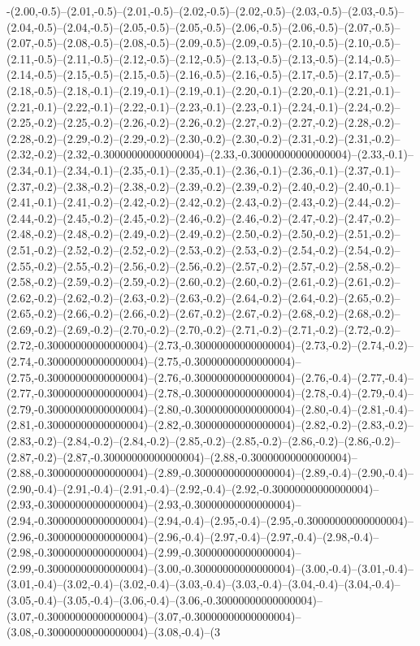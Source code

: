 -(2.00,-0.5)--(2.01,-0.5)--(2.01,-0.5)--(2.02,-0.5)--(2.02,-0.5)--(2.03,-0.5)--(2.03,-0.5)--(2.04,-0.5)--(2.04,-0.5)--(2.05,-0.5)--(2.05,-0.5)--(2.06,-0.5)--(2.06,-0.5)--(2.07,-0.5)--(2.07,-0.5)--(2.08,-0.5)--(2.08,-0.5)--(2.09,-0.5)--(2.09,-0.5)--(2.10,-0.5)--(2.10,-0.5)--(2.11,-0.5)--(2.11,-0.5)--(2.12,-0.5)--(2.12,-0.5)--(2.13,-0.5)--(2.13,-0.5)--(2.14,-0.5)--(2.14,-0.5)--(2.15,-0.5)--(2.15,-0.5)--(2.16,-0.5)--(2.16,-0.5)--(2.17,-0.5)--(2.17,-0.5)--(2.18,-0.5)--(2.18,-0.1)--(2.19,-0.1)--(2.19,-0.1)--(2.20,-0.1)--(2.20,-0.1)--(2.21,-0.1)--(2.21,-0.1)--(2.22,-0.1)--(2.22,-0.1)--(2.23,-0.1)--(2.23,-0.1)--(2.24,-0.1)--(2.24,-0.2)--(2.25,-0.2)--(2.25,-0.2)--(2.26,-0.2)--(2.26,-0.2)--(2.27,-0.2)--(2.27,-0.2)--(2.28,-0.2)--(2.28,-0.2)--(2.29,-0.2)--(2.29,-0.2)--(2.30,-0.2)--(2.30,-0.2)--(2.31,-0.2)--(2.31,-0.2)--(2.32,-0.2)--(2.32,-0.30000000000000004)--(2.33,-0.30000000000000004)--(2.33,-0.1)--(2.34,-0.1)--(2.34,-0.1)--(2.35,-0.1)--(2.35,-0.1)--(2.36,-0.1)--(2.36,-0.1)--(2.37,-0.1)--(2.37,-0.2)--(2.38,-0.2)--(2.38,-0.2)--(2.39,-0.2)--(2.39,-0.2)--(2.40,-0.2)--(2.40,-0.1)--(2.41,-0.1)--(2.41,-0.2)--(2.42,-0.2)--(2.42,-0.2)--(2.43,-0.2)--(2.43,-0.2)--(2.44,-0.2)--(2.44,-0.2)--(2.45,-0.2)--(2.45,-0.2)--(2.46,-0.2)--(2.46,-0.2)--(2.47,-0.2)--(2.47,-0.2)--(2.48,-0.2)--(2.48,-0.2)--(2.49,-0.2)--(2.49,-0.2)--(2.50,-0.2)--(2.50,-0.2)--(2.51,-0.2)--(2.51,-0.2)--(2.52,-0.2)--(2.52,-0.2)--(2.53,-0.2)--(2.53,-0.2)--(2.54,-0.2)--(2.54,-0.2)--(2.55,-0.2)--(2.55,-0.2)--(2.56,-0.2)--(2.56,-0.2)--(2.57,-0.2)--(2.57,-0.2)--(2.58,-0.2)--(2.58,-0.2)--(2.59,-0.2)--(2.59,-0.2)--(2.60,-0.2)--(2.60,-0.2)--(2.61,-0.2)--(2.61,-0.2)--(2.62,-0.2)--(2.62,-0.2)--(2.63,-0.2)--(2.63,-0.2)--(2.64,-0.2)--(2.64,-0.2)--(2.65,-0.2)--(2.65,-0.2)--(2.66,-0.2)--(2.66,-0.2)--(2.67,-0.2)--(2.67,-0.2)--(2.68,-0.2)--(2.68,-0.2)--(2.69,-0.2)--(2.69,-0.2)--(2.70,-0.2)--(2.70,-0.2)--(2.71,-0.2)--(2.71,-0.2)--(2.72,-0.2)--(2.72,-0.30000000000000004)--(2.73,-0.30000000000000004)--(2.73,-0.2)--(2.74,-0.2)--(2.74,-0.30000000000000004)--(2.75,-0.30000000000000004)--(2.75,-0.30000000000000004)--(2.76,-0.30000000000000004)--(2.76,-0.4)--(2.77,-0.4)--(2.77,-0.30000000000000004)--(2.78,-0.30000000000000004)--(2.78,-0.4)--(2.79,-0.4)--(2.79,-0.30000000000000004)--(2.80,-0.30000000000000004)--(2.80,-0.4)--(2.81,-0.4)--(2.81,-0.30000000000000004)--(2.82,-0.30000000000000004)--(2.82,-0.2)--(2.83,-0.2)--(2.83,-0.2)--(2.84,-0.2)--(2.84,-0.2)--(2.85,-0.2)--(2.85,-0.2)--(2.86,-0.2)--(2.86,-0.2)--(2.87,-0.2)--(2.87,-0.30000000000000004)--(2.88,-0.30000000000000004)--(2.88,-0.30000000000000004)--(2.89,-0.30000000000000004)--(2.89,-0.4)--(2.90,-0.4)--(2.90,-0.4)--(2.91,-0.4)--(2.91,-0.4)--(2.92,-0.4)--(2.92,-0.30000000000000004)--(2.93,-0.30000000000000004)--(2.93,-0.30000000000000004)--(2.94,-0.30000000000000004)--(2.94,-0.4)--(2.95,-0.4)--(2.95,-0.30000000000000004)--(2.96,-0.30000000000000004)--(2.96,-0.4)--(2.97,-0.4)--(2.97,-0.4)--(2.98,-0.4)--(2.98,-0.30000000000000004)--(2.99,-0.30000000000000004)--(2.99,-0.30000000000000004)--(3.00,-0.30000000000000004)--(3.00,-0.4)--(3.01,-0.4)--(3.01,-0.4)--(3.02,-0.4)--(3.02,-0.4)--(3.03,-0.4)--(3.03,-0.4)--(3.04,-0.4)--(3.04,-0.4)--(3.05,-0.4)--(3.05,-0.4)--(3.06,-0.4)--(3.06,-0.30000000000000004)--(3.07,-0.30000000000000004)--(3.07,-0.30000000000000004)--(3.08,-0.30000000000000004)--(3.08,-0.4)--(3